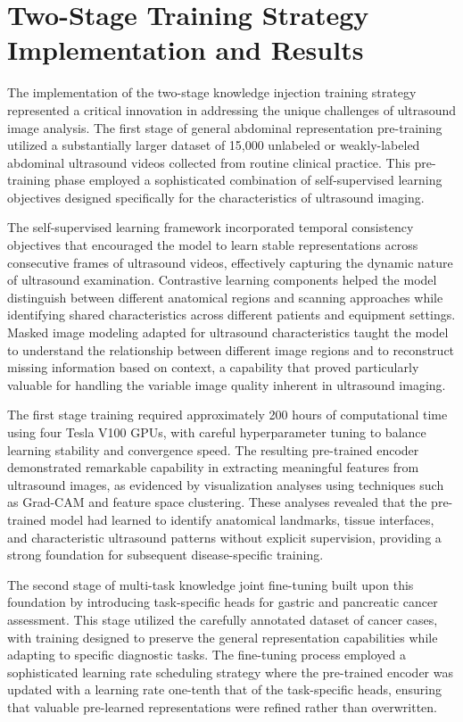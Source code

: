 \section{Two-Stage Training Strategy Implementation and Results}

The implementation of the two-stage knowledge injection training strategy represented a critical innovation in addressing the unique challenges of ultrasound image analysis. The first stage of general abdominal representation pre-training utilized a substantially larger dataset of 15,000 unlabeled or weakly-labeled abdominal ultrasound videos collected from routine clinical practice. This pre-training phase employed a sophisticated combination of self-supervised learning objectives designed specifically for the characteristics of ultrasound imaging.

The self-supervised learning framework incorporated temporal consistency objectives that encouraged the model to learn stable representations across consecutive frames of ultrasound videos, effectively capturing the dynamic nature of ultrasound examination. Contrastive learning components helped the model distinguish between different anatomical regions and scanning approaches while identifying shared characteristics across different patients and equipment settings. Masked image modeling adapted for ultrasound characteristics taught the model to understand the relationship between different image regions and to reconstruct missing information based on context, a capability that proved particularly valuable for handling the variable image quality inherent in ultrasound imaging.

The first stage training required approximately 200 hours of computational time using four Tesla V100 GPUs, with careful hyperparameter tuning to balance learning stability and convergence speed. The resulting pre-trained encoder demonstrated remarkable capability in extracting meaningful features from ultrasound images, as evidenced by visualization analyses using techniques such as Grad-CAM and feature space clustering. These analyses revealed that the pre-trained model had learned to identify anatomical landmarks, tissue interfaces, and characteristic ultrasound patterns without explicit supervision, providing a strong foundation for subsequent disease-specific training.

The second stage of multi-task knowledge joint fine-tuning built upon this foundation by introducing task-specific heads for gastric and pancreatic cancer assessment. This stage utilized the carefully annotated dataset of cancer cases, with training designed to preserve the general representation capabilities while adapting to specific diagnostic tasks. The fine-tuning process employed a sophisticated learning rate scheduling strategy where the pre-trained encoder was updated with a learning rate one-tenth that of the task-specific heads, ensuring that valuable pre-learned representations were refined rather than overwritten.

